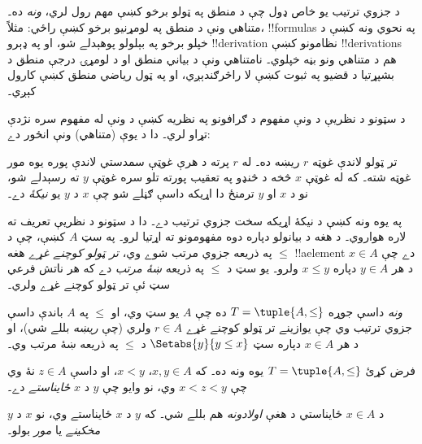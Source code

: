 \documentclass[../../../include/open-logic-section]{subfiles}
\begin{document}

د جزوي ترتيب يو خاص ډول چې د منطق په ټولو برخو کښې مهم رول لري،
\emph{ونه} ده۔ متناهي ونې د منطق په لومړنيو برخو کښې راځي:
مثلاً، !!{formula}s په نحوي ونه کښې د خپلو برخو په بېلولو پوهېدلے
شو، او په ډېرو !!{derivation} نظامونو کښې !!{derivation}s هم د
متناهي ونو بڼه خپلوي۔
%
نامتناهي ونې د بياني منطق او د لومړۍ درجې منطق د بشپړتيا د قضيو
په ثبوت کښې لا راڅرګندېږي، او په ټول رياضي منطق کښې کارول کېږي۔

د سټونو د نظريې د ونې مفهوم د ګرافونو په نظريه کښې د ونې له
مفهوم سره نژدې تړاو لري۔ دا د يوې (متناهي) ونې انځور دے:

\begin{center}
\end{center}

تر ټولو لاندې غوټه $r$ ريښه ده۔ له $r$ پرته د هرې غوټې سمدستي
لاندې پوره يوه مور غوټه شته۔ که له غوټې $x$ څخه د څنډو په تعقيب
پورته تلو سره غوټې $y$ ته رسېدلے شو، نو د $x$ او $y$ ترمنځ دا
اړيکه داسې ګڼلے شو چې $x$ د $y$ يو \emph{نيکۀ} دے۔

په يوه ونه کښې د نيکۀ اړيکه سخت جزوي ترتيب دے۔ دا د سټونو د
نظريې تعريف ته لاره هواروي۔ د هغه د بيانولو دپاره دوه مفهومونو ته
اړتيا لرو۔ په سټ $A$ کښې، چې د $\le$ په ذريعه جزوي مرتب شوے وي،
\emph{تر ټولو کوچنے غړے} هغه !!a{element} $x \in A$ دے چې د
هر $y \in A$ دپاره $x \le y$ ولرو۔ يو سټ د $\le$ په ذريعه
\emph{ښۀ مرتب} دے که هر ناتش فرعي سټ ئې تر ټولو کوچنے غړے ولري۔

\begin{defn}[ونه]
\emph{ونه} داسې جوړه $T = \tuple{A, \le}$ ده چې $A$ يو سټ وي،
او $\le$ په $A$ باندې داسې جزوي ترتيب وي چې يوازينے تر ټولو
کوچنے غړے $r \in A$ ولري (چې \emph{ريښه} بللے شي)، او د هر
$x \in A$ دپاره سټ $\Setabs{y}{y \le x}$ د $\le$ په ذريعه
ښۀ مرتب وي۔
\end{defn}

\begin{defn}[ځايناستي]
فرض کړئ $T = \tuple{A, \le}$ يوه ونه ده۔ که $x,y \in A$،
$x < y$، او داسې $z \in A$ نۀ وي چې $x < z < y$ وي، نو وايو
چې $y$ د $x$ \emph{ځايناستے} دے۔
\end{defn}

د $x \in A$ ځايناستي د هغې \emph{اولادونه} هم بللے شي۔ که $y$
د $x$ ځايناستے وي، نو $x$ د $y$ \emph{مخکينے} يا \emph{مور}
بولو۔
\end{document}
